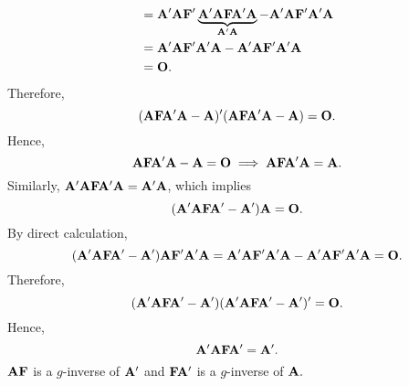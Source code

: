 \begin{Theorem}{}{}
\begin{enumerate}[(1)]
\begin{align*}
                   & =\mathbf{A}'\mathbf{A}\mathbf{F}'\underbrace{\mathbf{A}'\mathbf{A}\mathbf{F}\mathbf{A}'\mathbf{A}}_{\mathbf{A}'\mathbf{A}}-\mathbf{A}'\mathbf{A}\mathbf{F}'\mathbf{A}'\mathbf{A} \\
                   & =\mathbf{A}'\mathbf{A}\mathbf{F}'\mathbf{A}'\mathbf{A}-\mathbf{A}'\mathbf{A}\mathbf{F}'\mathbf{A}'\mathbf{A}                                                                     \\
                   & =\mathbf{O}.
              \end{align*}
              Therefore,
              \[ (\mathbf{A}\mathbf{F}\mathbf{A}'\mathbf{A}-\mathbf{A})'(\mathbf{A}\mathbf{F}\mathbf{A}'\mathbf{A}-\mathbf{A})=\mathbf{O}. \]
              Hence,
              \[ \mathbf{A}\mathbf{F}\mathbf{A}'\mathbf{A}-\mathbf{A}=\mathbf{O}\implies \mathbf{A}\mathbf{F}\mathbf{A}'\mathbf{A}=\mathbf{A}. \]
              Similarly, $ \mathbf{A}'\mathbf{A}\mathbf{F}\mathbf{A}'\mathbf{A}=\mathbf{A}'\mathbf{A} $, which implies
              \[ (\mathbf{A}'\mathbf{A}\mathbf{F}\mathbf{A}'-\mathbf{A}')\mathbf{A}=\mathbf{O}. \]
              By direct calculation,
              \[
                  (\mathbf{A}'\mathbf{A}\mathbf{F}\mathbf{A}'-\mathbf{A}')\mathbf{A}\mathbf{F}'\mathbf{A}'\mathbf{A}
                  =\mathbf{A}'\mathbf{A}\mathbf{F}'\mathbf{A}'\mathbf{A}-\mathbf{A}'\mathbf{A}\mathbf{F}'\mathbf{A}'\mathbf{A}
                  =\mathbf{O}. \]
              Therefore,
              \[ (\mathbf{A}'\mathbf{A}\mathbf{F}\mathbf{A}'-\mathbf{A}')(\mathbf{A}'\mathbf{A}\mathbf{F}\mathbf{A}'-\mathbf{A}')'=\mathbf{O}. \]
              Hence,
              \[ \mathbf{A}'\mathbf{A}\mathbf{F}\mathbf{A}'=\mathbf{A}'. \]
              $ \mathbf{A}\mathbf{F} $ is a $ g $-inverse of $ \mathbf{A}' $ and $ \mathbf{F}\mathbf{A}' $ is a $ g $-inverse of $ \mathbf{A}. $
    \end{enumerate}
\end{Theorem}
